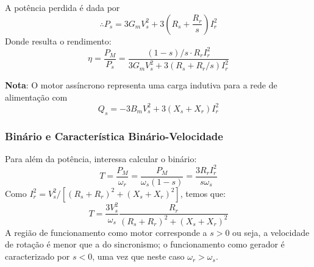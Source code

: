 \vspace{0.5em}
\noindent A potência perdida é dada por
$$
    \therefore P_s = 3G_m V^2_s + 3 \left(R_s + \frac{R_r}{s} \right) I^2_r
$$
Donde resulta o rendimento:
$$
    \eta = \frac{P_M}{P_s} = \frac{(1-s)/s \cdot R_r I^2_r}{3G_m V^2_s + 3(R_s + R_r/s) I^2_r}
$$

\begin{mdframed}
    \noindent \textbf{Nota}: O motor assíncrono representa uma carga indutiva para a rede de alimentação com
    $$
        Q_s = -3B_m V^2_s + 3(X_s + X_r) I^2_r
    $$
\end{mdframed}

\subsubsection{Binário e Característica Binário-Velocidade}

Para além da potência, interessa calcular o binário:
$$
    T = \frac{P_M}{\omega_r} = \frac{P_M}{\omega_s (1-s)} = \frac{3 R_r I^2_r}{s \omega_s}
$$
Como $I^2_r = V^2_s/[(R_s + R_r)^2 + (X_s + X_r)^2]$, temos que:
$$
    T = \frac{3 V^2_s}{\omega_s} \frac{R_r}{(R_s + R_r)^2 + (X_s + X_r)^2}
$$
A região de funcionamento como motor corresponde a $s>0$ ou seja, a velocidade de rotação é menor que a do sincronismo; o funcionamento como gerador é caracterizado por $s<0$, uma vez que neste caso $\omega_r>\omega_s$.

